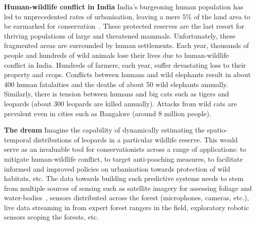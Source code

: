 \documentclass[a4paper,10pt,twocolumn]{article}
\newcommand{\hdg}[1] {\noindent \textbf{#1} }
\begin{document}
{ 
\Large 
{}%
}


\hdg{Human-wildlife conflict in India} India's burgeoning human population has led to unprecedented rates of urbanisation, leaving a mere 5\% of the land area to be earmarked for conservation~\cite{indiacons}. These protected reserves are the last resort for thriving populations of large and threatened mammals. Unfortunately, these fragmented areas are surrounded by human settlements. Each year, thousands of people and hundreds of wild animals lose their lives due to human-wildlife conflict in India. Hundreds of farmers, each year, suffer devastating loss to their property and crops. Conflicts between humans and wild elephants result in about 400 human fatalaities and the deaths of about 50 wild elephants annually. Similarly, there is tension between humans and big cats such as tigers and leopards (about 300 leopards are killed annually). Attacks from wild cats are prevalent even in cities such as Bangalore (around 8 million people).

\hdg{The dream}
Imagine the capability of dynamically estimating the spatio-temporal distributions of leopards in a particular wildlife reserve. This would serve as an invaluable tool for conservationists across a range of applications: to mitigate human-wildlife conflict, to target anti-poaching measures, to facilitate informed and improved policies on urbanisation towards protection of wild habitats, etc. The data towards building such predictive systems needs to stem from multiple sources of sensing such as satellite imagery for assessing foliage and water-bodies~\cite{urthecast}, sensors distributed across the forest (microphones, cameras, etc.), live data streaming in from expert forest rangers in the field, exploratory robotic sensors scoping the forests, etc. 
\end{document}
